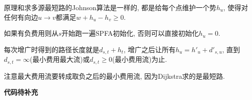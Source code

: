 原理和求多源最短路的Johnson算法是一样的, 都是给每个点维护一个势$h_u$, 使得对任何有向边$u\to v$都满足$w + h_u - h_v \ge 0$.

如果有负费用则从$s$开始跑一遍SPFA初始化, 否则可以直接初始化$h_u = 0$.

每次增广时得到的路径长度就是$d_{s, t} + h_t$, 增广之后让所有$h_u = h'_u + d'_{s, u}$, 直到$d_{s, t} = \infty$(最小费用最大流)或$d_{s, t} \ge 0$(最小费用流)为止.

注意最大费用流要转成取负之后的最小费用流, 因为Dijkstra求的是最短路.

\textbf{代码待补充}